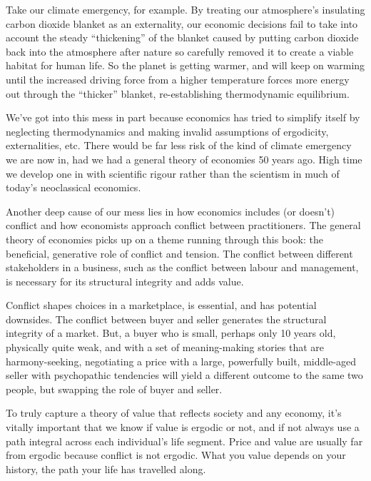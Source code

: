 Take our climate emergency,  for example. By treating our atmosphere’s insulating carbon dioxide blanket as an externality, our economic decisions fail to take into account the steady “thickening” of the blanket caused by putting carbon dioxide back into the atmosphere after nature so carefully removed it to create a viable habitat for human life. So the planet is getting warmer, and will keep on warming until the increased driving force from a higher temperature forces more energy out through the “thicker” blanket, re-establishing thermodynamic equilibrium. 


We've got into this mess in part because economics  has tried to simplify itself by neglecting thermodynamics and making invalid assumptions of ergodicity, externalities, etc. There would be far less risk of the kind of climate emergency we are now in, had we had a general theory of economies 50 years ago. High time we develop one in with scientific rigour rather than the scientism in much of today’s neoclassical economics. 


Another deep cause of our mess lies in how economics includes (or doesn’t) conflict and how economists approach conflict between practitioners. The general theory of economies  picks up on a theme running through this book: the beneficial, generative role of conflict and tension. The conflict  between different stakeholders  in a business, such as the conflict  between labour and management, is necessary for its structural integrity and adds value.


Conflict shapes choices in a marketplace, is essential, and has potential downsides. The conflict between buyer and seller generates the structural integrity of a market. But, a buyer who is small, perhaps only 10 years old, physically quite weak, and with a set of meaning-making stories that are harmony-seeking, negotiating a price with a large, powerfully built, middle-aged seller with psychopathic tendencies will yield a different outcome to the same two people, but swapping the role of buyer and seller.  


To truly capture a theory of value that reflects society and any economy, it's vitally important that we know if value is ergodic or not, and if not always use a path integral across each individual's life segment. Price and value are usually far from ergodic because conflict is not ergodic.  What you value depends on your history, the path your life has travelled along.


